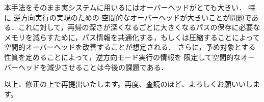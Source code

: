 \documentclass[a4j]{jarticle}
\begin{document}
\begin{enumerate}
本手法をそのまま実システムに用いるにはオーバーヘッドがとても大きい．
特に%
逆方向実行の実現のための%
空間的なオーバーヘッドが大きいことが問題である．これに対して，再帰の深さが深くなるごとに大きくなるパスの保存に必要なメモリを減らすために，パス情報を共通化する，もしくは圧縮することによって空間的オーバーヘッドを改善することが想定される．
さらに，予め対象とする性質を定めることによって，逆方向モード実行の情報を
限定して空間的なオーバーヘッドを減少させることは今後の課題である．

\end{enumerate}

以上、修正の上で再提出いたします。再度、査読のほど、よろしくお願いいします。
\end{document}
